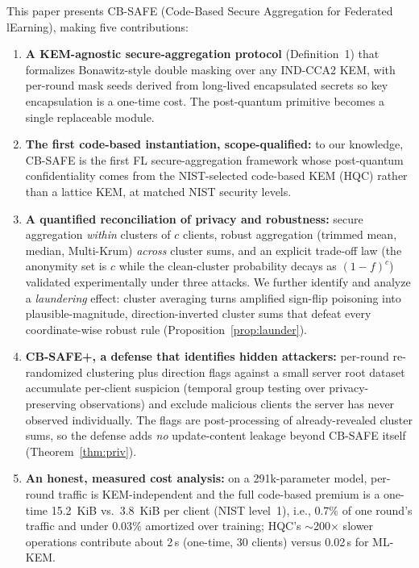 \documentclass[lettersize,journal]{IEEEtran}
\begin{document}
This paper presents CB-SAFE (Code-Based Secure Aggregation for Federated
lEarning), making five contributions:
\begin{enumerate}
\item \textbf{A KEM-agnostic secure-aggregation protocol} (Definition~1) that
formalizes Bonawitz-style double masking over any IND-CCA2 KEM, with per-round mask
seeds derived from long-lived encapsulated secrets so key encapsulation is a one-time
cost. The post-quantum primitive becomes a single replaceable module.
\item \textbf{The first code-based instantiation, scope-qualified:} to our knowledge,
CB-SAFE is the first FL secure-aggregation framework whose post-quantum
confidentiality comes from the NIST-selected code-based KEM (HQC) rather than a
lattice KEM, at matched NIST security levels.
\item \textbf{A quantified reconciliation of privacy and robustness:} secure
aggregation \emph{within} clusters of $c$ clients, robust aggregation (trimmed mean,
median, Multi-Krum) \emph{across} cluster sums, and an explicit trade-off law (the
anonymity set is $c$ while the clean-cluster probability decays as $(1-f)^c$)
validated experimentally under three attacks. We further identify and analyze a
\emph{laundering} effect: cluster averaging turns amplified sign-flip poisoning into
plausible-magnitude, direction-inverted cluster sums that defeat every
coordinate-wise robust rule (Proposition~\ref{prop:launder}).
\item \textbf{CB-SAFE+, a defense that identifies hidden attackers:} per-round
re-randomized clustering plus direction flags against a small server root dataset
accumulate per-client suspicion (temporal group testing over privacy-preserving
observations) and exclude malicious clients the server has never observed
individually. The flags are post-processing of already-revealed cluster sums, so the
defense adds \emph{no} update-content leakage beyond CB-SAFE itself (Theorem~\ref{thm:priv}).
\item \textbf{An honest, measured cost analysis:} on a 291k-parameter model,
per-round traffic is KEM-independent and the full code-based premium is a one-time
15.2~KiB vs.\ 3.8~KiB per client (NIST level~1), i.e., $0.7\%$ of one round's
traffic and under $0.03\%$ amortized over training; HQC's $\sim$200$\times$ slower operations contribute about 2\,s (one-time,
30 clients) versus 0.02\,s for ML-KEM.
\end{enumerate}
\end{document}
